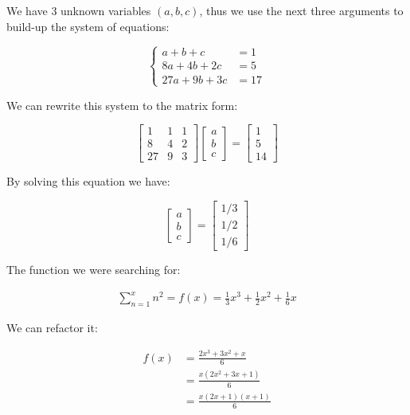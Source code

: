 \documentclass[14pt]{article}
\begin{document}
      We have 3 unknown variables $(a, b, c)$, thus we use the next three arguments to build-up the system of equations:

      $$
      \left\{
      \begin{array}{ll}
      a + b + c &= 1 \\
      8a + 4b + 2c &= 5 \\
      27a + 9b + 3c &= 17
      \end{array}
      \right.
      $$

      We can rewrite this system to the matrix form:

      $$ \left[
      \begin{array}{ccc}
        1&1&1\\
        8&4&2\\
        27&9&3
      \end{array}
      \right]
      \left[
        \begin{array}{ccc}
        a\\
        b\\
        c
      \end{array}
      \right]
      =
      \left[
        \begin{array}{ccc}
        1\\
        5\\
        14
      \end{array}
      \right] $$

      By solving this equation we have:

      $$
      \left[
      \begin{array}{ccc}
        a\\
        b\\
        c
      \end{array}
      \right]
      =
      \left[
        \begin{array}{ccc}
        1/3\\
        1/2\\
        1/6
      \end{array}
      \right] $$

      The function we were searching for:

      $$
      \begin{aligned}
      \sum_{n = 1}^{x}n^2 = f(x) = \frac{1}{3}x^3 + \frac{1}{2}x^2 + \frac{1}{6}x
      \end{aligned}
      $$

      We can refactor it:

      $$
      \begin{aligned}
        f(x) &= \frac{2x^3 + 3x^2 + x}{6} \\
            &= \frac{x(2x^2 + 3x + 1)}{6} \\
            &= \frac{x(2x + 1)(x + 1)}{6}
      \end{aligned}
      $$
\end{document}
